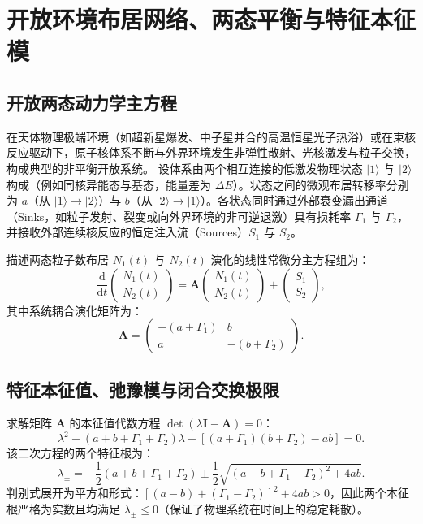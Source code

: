 \section{开放环境布居网络、两态平衡与特征本征模}\label{sec:appD-open-network}

\subsection{开放两态动力学主方程}

在天体物理极端环境（如超新星爆发、中子星并合的高温恒星光子热浴）或在束核反应驱动下，原子核体系不断与外界环境发生非弹性散射、光核激发与粒子交换，构成典型的非平衡开放系统。
设体系由两个相互连接的低激发物理状态 $|1\rangle$ 与 $|2\rangle$ 构成（例如同核异能态与基态，能量差为 $\Delta E$）。状态之间的微观布居转移率分别为 $a$（从 $|1\rangle \to |2\rangle$）与 $b$（从 $|2\rangle \to |1\rangle$）。各状态同时通过外部衰变漏出通道（Sinks，如粒子发射、裂变或向外界环境的非可逆退激）具有损耗率 $\Gamma_1$ 与 $\Gamma_2$，并接收外部连续核反应的恒定注入流（Sources）$S_1$ 与 $S_2$。

描述两态粒子数布居 $N_1(t)$ 与 $N_2(t)$ 演化的线性常微分主方程组为：
\begin{equation}\label{eq:appD-master-eq-2state}
\frac{\mathrm{d}}{\mathrm{d}t} \begin{pmatrix} N_1(t) \\ N_2(t) \end{pmatrix} = \mathbf{A} \begin{pmatrix} N_1(t) \\ N_2(t) \end{pmatrix} + \begin{pmatrix} S_1 \\ S_2 \end{pmatrix},
\end{equation}
其中系统耦合演化矩阵为：
\begin{equation}\label{eq:appD-coupling-matrix}
\mathbf{A} = \begin{pmatrix} -(a + \Gamma_1) & b \\ a & -(b + \Gamma_2) \end{pmatrix}.
\end{equation}

\subsection{特征本征值、弛豫模与闭合交换极限}

求解矩阵 $\mathbf{A}$ 的本征值代数方程 $\det(\lambda \mathbf{I} - \mathbf{A}) = 0$：
\begin{equation}\label{eq:appD-char-eq}
\lambda^2 + (a + b + \Gamma_1 + \Gamma_2) \lambda + \left[ (a + \Gamma_1)(b + \Gamma_2) - a b \right] = 0.
\end{equation}
该二次方程的两个特征根为：
\begin{equation}\label{eq:appD-eigenvalues-2state}
\lambda_\pm = -\frac{1}{2}(a + b + \Gamma_1 + \Gamma_2) \pm \frac{1}{2} \sqrt{(a - b + \Gamma_1 - \Gamma_2)^2 + 4 a b}.
\end{equation}
判别式展开为平方和形式：$[(a - b) + (\Gamma_1 - \Gamma_2)]^2 + 4 a b > 0$，因此两个本征根严格为实数且均满足 $\lambda_\pm \le 0$（保证了物理系统在时间上的稳定耗散）。


